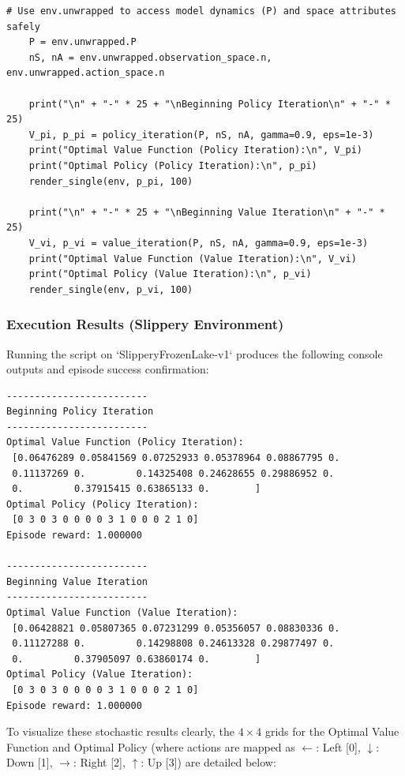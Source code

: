 \documentclass{article}
\begin{document}
\begin{enumerate}
\begin{lstlisting}[caption={Execution script for SlipperyFrozenLake using Policy and Value Iteration},label={lst:slippery_exec}]
    # Use env.unwrapped to access model dynamics (P) and space attributes safely
    P = env.unwrapped.P
    nS, nA = env.unwrapped.observation_space.n, env.unwrapped.action_space.n

    print("\n" + "-" * 25 + "\nBeginning Policy Iteration\n" + "-" * 25)
    V_pi, p_pi = policy_iteration(P, nS, nA, gamma=0.9, eps=1e-3)
    print("Optimal Value Function (Policy Iteration):\n", V_pi)
    print("Optimal Policy (Policy Iteration):\n", p_pi)
    render_single(env, p_pi, 100)

    print("\n" + "-" * 25 + "\nBeginning Value Iteration\n" + "-" * 25)
    V_vi, p_vi = value_iteration(P, nS, nA, gamma=0.9, eps=1e-3)
    print("Optimal Value Function (Value Iteration):\n", V_vi)
    print("Optimal Policy (Value Iteration):\n", p_vi)
    render_single(env, p_vi, 100)
\end{lstlisting}

\subsubsection*{Execution Results (Slippery Environment)}
Running the script on `SlipperyFrozenLake-v1` produces the following console outputs and episode success confirmation:

\begin{verbatim}
-------------------------
Beginning Policy Iteration
-------------------------
Optimal Value Function (Policy Iteration):
 [0.06476289 0.05841569 0.07252933 0.05378964 0.08867795 0.         
 0.11137269 0.         0.14325408 0.24628655 0.29886952 0.         
 0.         0.37915415 0.63865133 0.        ]
Optimal Policy (Policy Iteration):
 [0 3 0 3 0 0 0 0 3 1 0 0 0 2 1 0]
Episode reward: 1.000000

-------------------------
Beginning Value Iteration
-------------------------
Optimal Value Function (Value Iteration):
 [0.06428821 0.05807365 0.07231299 0.05356057 0.08830336 0.         
 0.11127288 0.         0.14298808 0.24613328 0.29877497 0.         
 0.         0.37905097 0.63860174 0.        ]
Optimal Policy (Value Iteration):
 [0 3 0 3 0 0 0 0 3 1 0 0 0 2 1 0]
Episode reward: 1.000000
\end{verbatim}

To visualize these stochastic results clearly, the $4 \times 4$ grids for the Optimal Value Function and Optimal Policy (where actions are mapped as $\leftarrow$: Left [0], $\downarrow$: Down [1], $\rightarrow$: Right [2], $\uparrow$: Up [3]) are detailed below:


\end{enumerate}
\end{document}
